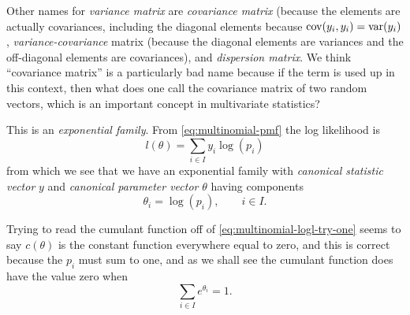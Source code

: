 Other names for \emph{variance matrix} are \emph{covariance matrix} (because
the elements are actually covariances, including the diagonal elements because
$\operatorname{cov}(y_i, y_i) = \operatorname{var}(y_i)$, \emph{variance-covariance} matrix (because
the diagonal elements are variances and the off-diagonal elements are
covariances), and \emph{dispersion matrix}.  We think ``covariance matrix''
is a particularly bad name because if the term is used up in this context,
then what does one call the covariance matrix of two random vectors, which
is an important concept in multivariate statistics?

This is an \emph{exponential family}.  From \eqref{eq:multinomial-pmf}
the log likelihood is
\begin{equation} \label{eq:multinomial-logl-try-one}
   l(\theta) = \sum_{i \in I} y_i \log(p_i)
\end{equation}
from which we see that we have an exponential family with
\emph{canonical statistic vector} $y$ and \emph{canonical parameter vector}
$\theta$ having components
\begin{equation} \label{eq:multinomial-canonical-try-one}
   \theta_i = \log(p_i), \qquad i \in I.
\end{equation}

Trying to read the cumulant function off of \eqref{eq:multinomial-logl-try-one}
seems to say $c(\theta)$ is the constant function everywhere equal to zero,
and this is correct because the $p_i$ must sum to one, and as we shall see
the cumulant function does have the value zero
when
\begin{equation} \label{eq:multinomial-canonical-constraint-try-one}
   \sum_{i \in I} e^{\theta_i} = 1.
\end{equation}

